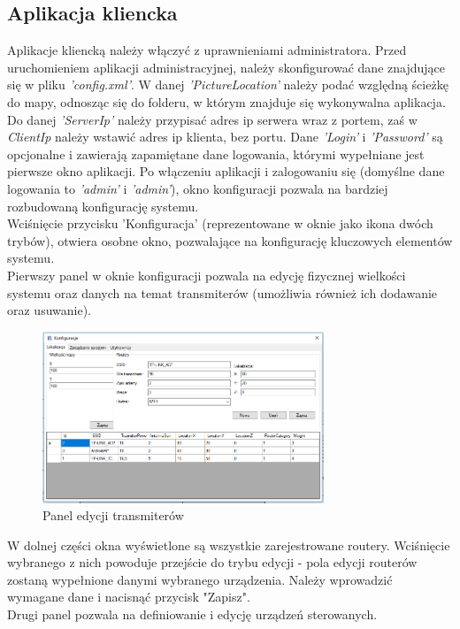\documentclass{article}
\begin{document}
	
	\subsection{Aplikacja kliencka}
	
	Aplikacje kliencką należy włączyć z uprawnieniami administratora. Przed uruchomieniem aplikacji administracyjnej, należy skonfigurować dane znajdujące się w pliku \textit{'config.xml'}. W danej \textit{'PictureLocation'} należy podać względną ścieżkę do mapy, odnosząc się do folderu, w którym znajduje się wykonywalna aplikacja. Do danej \textit{'ServerIp'} należy przypisać adres ip serwera wraz z portem, zaś w \textit{ClientIp} należy wstawić adres ip klienta, bez portu. Dane \textit{'Login'} i \textit{'Password'} są opcjonalne i zawierają zapamiętane dane logowania, którymi wypełniane jest pierwsze okno aplikacji. Po włączeniu aplikacji i zalogowaniu się (domyślne dane logowania to \textit{'admin'} i \textit{'admin'}), okno konfiguracji pozwala na bardziej rozbudowaną konfigurację systemu.\\
	Wciśnięcie przycisku 'Konfiguracja' (reprezentowane w oknie jako ikona dwóch trybów), otwiera osobne okno, pozwalające na konfigurację kluczowych elementów systemu.\\
	Pierwszy panel w oknie konfiguracji pozwala na edycję fizycznej wielkości systemu oraz danych na temat transmiterów (umożliwia również ich dodawanie oraz usuwanie).
	\begin{figure}[H]			
		\centering
		\caption{Panel edycji transmiterów}
		\includegraphics[width=0.75\textwidth]{panel_konf_router}
	\end{figure}
	W dolnej części okna wyświetlone są wszystkie zarejestrowane routery. Wciśnięcie wybranego z nich powoduje przejście do trybu edycji - pola edycji routerów zostaną wypełnione danymi wybranego urządzenia. Należy wprowadzić wymagane dane i nacisnąć przycisk "Zapisz".\\
	Drugi panel pozwala na definiowanie i edycję urządzeń sterowanych.
\end{document}
